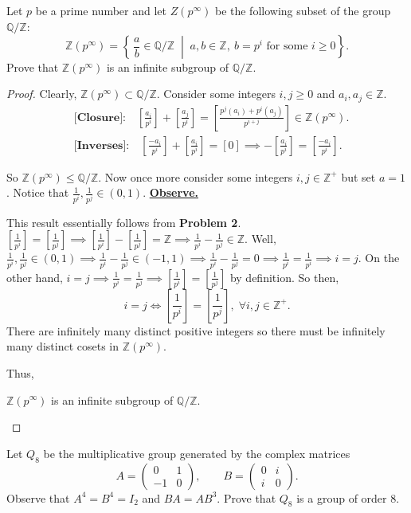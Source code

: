 \documentclass[addpoints,10pt]{exam}
\theoremstyle{plain}
\theoremstyle{definition}
\newtheorem{prob}[thm]{Problem}
\theoremstyle{plain}
\theoremstyle{plain}
\theoremstyle{definition}
\let\oldprob\prob
\let\endoldprob\endprob
\renewenvironment{prob}
  {\begin{singlespace}\oldprob}
  {\endoldprob\end{singlespace}}
\newcommand{\QQ}{\ensuremath{\mathbb{Q}}}
\newcommand{\ZZ}{\ensuremath{\mathbb{Z}}}
\begin{document}
\begin{prob}
  Let $p$ be a prime number and let $Z(p^\infty)$ be the following subset of the group $\mathbb{Q}/\mathbb{Z}$:
  \[
  \ZZ(p^\infty)=\left\{\, \frac{a}{b} \in \mathbb{Q}/\mathbb{Z} \;\middle|\; a,b\in\mathbb{Z},\ b=p^i \text{ for some } i \ge 0 \right\}.
  \]
  Prove that $\ZZ(p^\infty)$ is an infinite subgroup of $\mathbb{Q}/\mathbb{Z}$.
\end{prob}

\begin{proof}
    Clearly, $\ZZ(p^{\infty})\subset \QQ/\ZZ$. Consider some integers $i,j\geq 0$ and $a_{i},a_{j}\in \ZZ$. 
    \begin{align*}
      &\textbf{[Closure]:}\quad[\frac{a_{i}}{p^{i}}]+[\frac{a_{j}}{p^{i}}]=[\frac{p^{j}(a_{i})+p^{i}(a_{j})}{p^{i+j}}]\in \ZZ(p^{\infty}).\\
      &\textbf{[Inverses]:}\quad[\frac{-a_{i}}{p^{i}}]+[\frac{a_{i}}{p^{i}}]=[0]\implies -[\frac{a_{i}}{p^{i}}]=[\frac{-a_{i}}{p^{i}}].
    \end{align*}

    So $\ZZ(p^{\infty})\leq \QQ/\ZZ$. Now once more consider some integers $i,j\in \ZZ^{+}$ but set $a=1$. Notice that $\frac{1}{p^{i}},\frac{1}{p^{j}}\in (0,1)$. \underline{\textbf{Observe.}}

    This result essentially follows from \textbf{Problem 2}. $[\frac{1}{p^{i}}]=[\frac{1}{p^{j}}]\implies [\frac{1}{p^{i}}]-[\frac{1}{p^{j}}]=\ZZ\implies \frac{1}{p^{i}}-\frac{1}{p^{j}}\in \ZZ$. Well, $\frac{1}{p^{i}},\frac{1}{p^{j}}\in (0,1)\implies \frac{1}{p^{i}}-\frac{1}{p^{j}}\in (-1,1)\implies \frac{1}{p^{i}}-\frac{1}{p^{j}}=0\implies \frac{1}{p^{i}}=\frac{1}{p^{i}}\implies i=j$. On the other hand, $i=j\implies \frac{1}{p^{i}}=\frac{1}{p^{j}}\implies [\frac{1}{p^{i}}]=[\frac{1}{p^{j}}]$ by definition. So then,
    $$i=j\iff [\frac{1}{p^{i}}]=[\frac{1}{p^{j}}],\;\forall i,j\in \ZZ^{+}.$$
    There are infinitely many distinct positive integers so there must be infinitely many distinct cosets in $\ZZ(p^{\infty})$.

    Thus,
    \begin{center}
    $\ZZ(p^{\infty})$ is an infinite subgroup of $\QQ/\ZZ$.
    \end{center}
\end{proof}
\newpage
\setcounter{thm}{4}   %

\begin{prob}
  Let $Q_8$ be the multiplicative group generated by the complex matrices
  \[
  A=\begin{pmatrix}0 & 1 \\ -1 & 0\end{pmatrix},
  \qquad
  B=\begin{pmatrix}0 & i \\ i & 0\end{pmatrix}.
  \]
  Observe that $A^4=B^4=I_2$ and $BA=AB^3$. Prove that $Q_8$ is a group of order $8$.
\end{prob}
\end{document}
